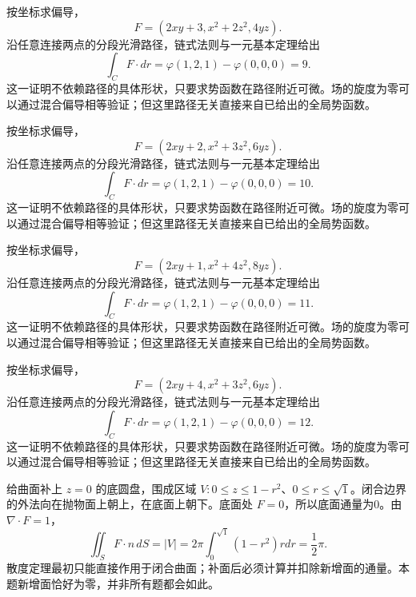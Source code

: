 \documentclass[12pt,fontset=fandol]{ctexart}
\begin{document}
\begin{solve}\label{ans:c44q15}
按坐标求偏导，
\[
F=(2xy+3,x^2+2z^2,4yz).
\]
沿任意连接两点的分段光滑路径，链式法则与一元基本定理给出
\[
\int_CF\cdot dr=\varphi(1,2,1)-\varphi(0,0,0)=9.
\]
这一证明不依赖路径的具体形状，只要求势函数在路径附近可微。场的旋度为零可以通过混合偏导相等验证；但这里路径无关直接来自已给出的全局势函数。
\end{solve}

\begin{solve}\label{ans:c44q16}
按坐标求偏导，
\[
F=(2xy+2,x^2+3z^2,6yz).
\]
沿任意连接两点的分段光滑路径，链式法则与一元基本定理给出
\[
\int_CF\cdot dr=\varphi(1,2,1)-\varphi(0,0,0)=10.
\]
这一证明不依赖路径的具体形状，只要求势函数在路径附近可微。场的旋度为零可以通过混合偏导相等验证；但这里路径无关直接来自已给出的全局势函数。
\end{solve}

\begin{solve}\label{ans:c44q17}
按坐标求偏导，
\[
F=(2xy+1,x^2+4z^2,8yz).
\]
沿任意连接两点的分段光滑路径，链式法则与一元基本定理给出
\[
\int_CF\cdot dr=\varphi(1,2,1)-\varphi(0,0,0)=11.
\]
这一证明不依赖路径的具体形状，只要求势函数在路径附近可微。场的旋度为零可以通过混合偏导相等验证；但这里路径无关直接来自已给出的全局势函数。
\end{solve}

\begin{solve}\label{ans:c44q18}
按坐标求偏导，
\[
F=(2xy+4,x^2+3z^2,6yz).
\]
沿任意连接两点的分段光滑路径，链式法则与一元基本定理给出
\[
\int_CF\cdot dr=\varphi(1,2,1)-\varphi(0,0,0)=12.
\]
这一证明不依赖路径的具体形状，只要求势函数在路径附近可微。场的旋度为零可以通过混合偏导相等验证；但这里路径无关直接来自已给出的全局势函数。
\end{solve}

\begin{solve}\label{ans:c44q19}
给曲面补上 $z=0$ 的底圆盘，围成区域 $V:0\le z\le 1-r^2$、$0\le r\le\sqrt{1}$。闭合边界的外法向在抛物面上朝上，在底面上朝下。底面处 $F=0$，所以底面通量为0。由 $\nabla\cdot F=1$，
\[
\iint_SF\cdot n\,dS=|V|=2\pi\int_0^{\sqrt{1}}(1-r^2)rdr=\frac{1}{2}\pi.
\]
散度定理最初只能直接作用于闭合曲面；补面后必须计算并扣除新增面的通量。本题新增面恰好为零，并非所有题都会如此。
\end{solve}
\end{document}
